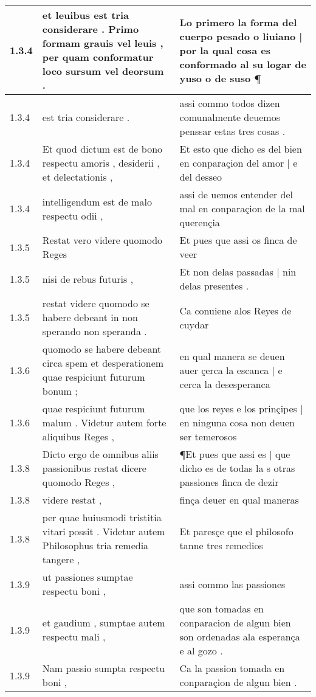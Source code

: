 \begin{tabular}{|p{1cm}|p{6.5cm}|p{6.5cm}|}
1.3.4 & et leuibus est tria considerare . Primo formam grauis vel leuis , per quam conformatur loco sursum vel deorsum . & Lo primero la forma del cuerpo pesado o liuiano | por la qual cosa es conformado al su logar de yuso o de suso ¶ \\\hline
1.3.4 & est tria considerare . & assi commo todos dizen comunalmente deuemos penssar estas tres cosas . \\\hline
1.3.4 & Et quod dictum est de bono respectu amoris , desiderii , et delectationis , & Et esto que dicho es del bien en conparaçion del amor | e del desseo \\\hline
1.3.4 & intelligendum est de malo respectu odii , & assi de uemos entender del mal en conparaçion de la mal querençia \\\hline
1.3.5 & Restat vero videre quomodo Reges & Et pues que assi os finca de veer \\\hline
1.3.5 & nisi de rebus futuris , & Et non delas passadas | nin delas presentes . \\\hline
1.3.5 & restat videre quomodo se habere debeant in non sperando non speranda . & Ca conuiene alos Reyes de cuydar \\\hline
1.3.6 & quomodo se habere debeant circa spem et desperationem quae respiciunt futurum bonum ; & en qual manera se deuen auer çerca la escanca | e cerca la desesperanca \\\hline
1.3.6 & quae respiciunt futurum malum . Videtur autem forte aliquibus Reges , & que los reyes e los prinçipes | en ninguna cosa non deuen ser temerosos \\\hline
1.3.8 & Dicto ergo de omnibus aliis passionibus restat dicere quomodo Reges , & ¶Et pues que assi es | que dicho es de todas la s otras passiones finca de dezir \\\hline
1.3.8 & videre restat , & finça deuer en qual maneras \\\hline
1.3.8 & per quae huiusmodi tristitia vitari possit . Videtur autem Philosophus tria remedia tangere , & Et paresçe que el philosofo tanne tres remedios \\\hline
1.3.9 & ut passiones sumptae respectu boni , & assi commo las passiones \\\hline
1.3.9 & et gaudium , sumptae autem respectu mali , & que son tomadas en conparacion de algun bien son ordenadas ala esperança e al gozo . \\\hline
1.3.9 & Nam passio sumpta respectu boni , & Ca la passion tomada en conparaçion de algun bien . \\\hline

\end{tabular}
